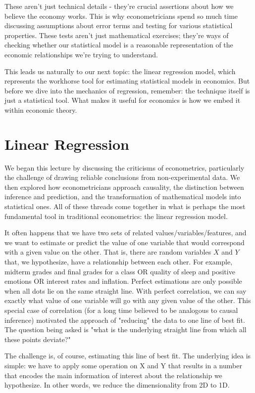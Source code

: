 \documentclass[10pt]{article}
\begin{document}
These aren't just technical details - they're crucial assertions about how we believe the economy works. This is why econometricians spend so much time discussing assumptions about error terms and testing for various statistical properties. These tests aren't just mathematical exercises; they're ways of checking whether our statistical model is a reasonable representation of the economic relationships we're trying to understand.

This leads us naturally to our next topic: the linear regression model, which represents the workhorse tool for estimating statistical models in economics. But before we dive into the mechanics of regression, remember: the technique itself is just a statistical tool. What makes it useful for economics is how we embed it within economic theory.

\section*{Linear Regression}
We began this lecture by discussing the criticisms of econometrics, particularly the challenge of drawing reliable conclusions from non-experimental data. We then explored how econometricians approach causality, the distinction between inference and prediction, and the transformation of mathematical models into statistical ones. All of these threads come together in what is perhaps the most fundamental tool in traditional econometrics: the linear regression model.

It often happens that we have two sets of related values/variables/features, and we want to estimate or predict the value of one variable that would correspond with a given value on the other. That is, there are random variables $X$ and $Y$ that, we hypothesize, have a relationship between each other. For example, midterm grades and final grades for a class OR quality of sleep and positive emotions OR interest rates and inflation. Perfect estimations are only possible when all dots lie on the same straight line. With perfect correlation, we can say exactly what value of one variable will go with any given value of the other. This special case of correlation (for a long time believed to be analogous to causal inference) motivated the approach of "reducing" the data to one line of best fit. The question being asked is "what is the underlying straight line from which all these points deviate?"

The challenge is, of course, estimating this line of best fit. The underlying idea is simple: we have to apply some operation on X and Y that results in a number that encodes the main information of interest about the relationship we hypothesize. In other words, we reduce the dimensionality from 2D to 1D.
\end{document}
